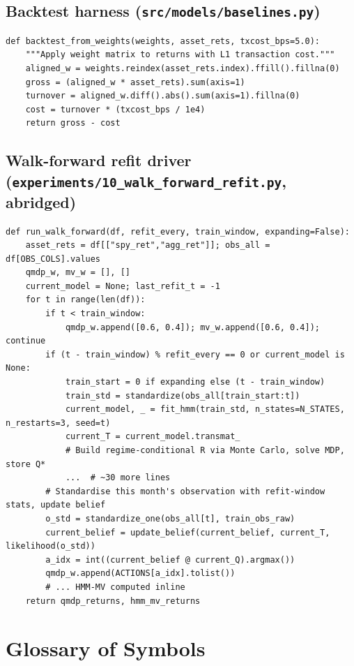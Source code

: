 \documentclass[11pt]{article}
\theoremstyle{plain1}
\theoremstyle{definition1}
\newcommand{\1}{\mathbf{1}}
\begin{document}
\subsection{Backtest harness (\texttt{src/models/baselines.py})}
\begin{lstlisting}
def backtest_from_weights(weights, asset_rets, txcost_bps=5.0):
    """Apply weight matrix to returns with L1 transaction cost."""
    aligned_w = weights.reindex(asset_rets.index).ffill().fillna(0)
    gross = (aligned_w * asset_rets).sum(axis=1)
    turnover = aligned_w.diff().abs().sum(axis=1).fillna(0)
    cost = turnover * (txcost_bps / 1e4)
    return gross - cost
\end{lstlisting}

\subsection{Walk-forward refit driver (\texttt{experiments/10\_walk\_forward\_refit.py}, abridged)}
\begin{lstlisting}
def run_walk_forward(df, refit_every, train_window, expanding=False):
    asset_rets = df[["spy_ret","agg_ret"]]; obs_all = df[OBS_COLS].values
    qmdp_w, mv_w = [], []
    current_model = None; last_refit_t = -1
    for t in range(len(df)):
        if t < train_window:
            qmdp_w.append([0.6, 0.4]); mv_w.append([0.6, 0.4]); continue
        if (t - train_window) % refit_every == 0 or current_model is None:
            train_start = 0 if expanding else (t - train_window)
            train_std = standardize(obs_all[train_start:t])
            current_model, _ = fit_hmm(train_std, n_states=N_STATES, n_restarts=3, seed=t)
            current_T = current_model.transmat_
            # Build regime-conditional R via Monte Carlo, solve MDP, store Q*
            ...  # ~30 more lines
        # Standardise this month's observation with refit-window stats, update belief
        o_std = standardize_one(obs_all[t], train_obs_raw)
        current_belief = update_belief(current_belief, current_T, likelihood(o_std))
        a_idx = int((current_belief @ current_Q).argmax())
        qmdp_w.append(ACTIONS[a_idx].tolist())
        # ... HMM-MV computed inline
    return qmdp_returns, hmm_mv_returns
\end{lstlisting}

\section{Glossary of Symbols}\label{sec:glossary}
\end{document}
